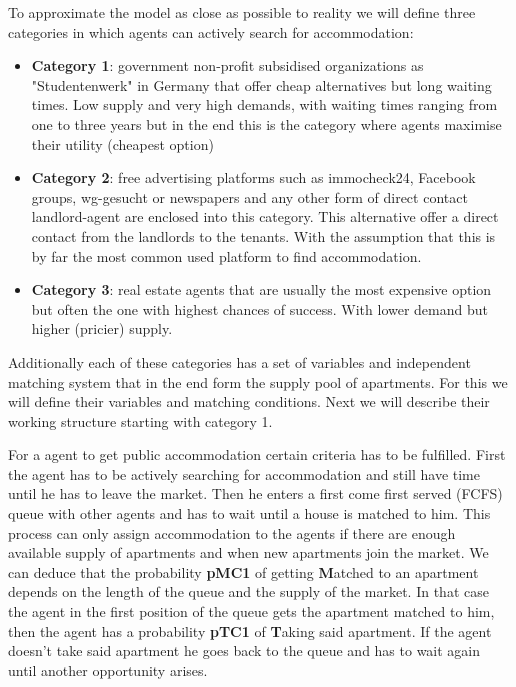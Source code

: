 To approximate the model as close as possible to reality we will define three categories in which agents can actively search for accommodation:
\begin{itemize}
        \item \textbf{Category 1}: government non-profit subsidised organizations as "Studentenwerk" in Germany that offer cheap alternatives but long waiting times. Low supply and very high demands, with waiting times ranging from one to three years but in the end this is the category where agents maximise their utility (cheapest option)
        \item \textbf{Category 2}: free advertising platforms such as immocheck24, Facebook groups, wg-gesucht or newspapers and any other form of direct contact landlord-agent are enclosed into this category. This alternative offer a direct contact from the landlords to the tenants. With the assumption that this is by far the most common used platform to find accommodation.
        \item \textbf{Category 3}: real estate agents that are usually the most expensive option but often the one with highest chances of success. With lower demand but higher (pricier) supply.
\end{itemize}

Additionally each of these categories has a set of variables and independent matching system that in the end form the supply pool of apartments. For this we will define their variables and matching conditions. Next we will describe their working structure starting with category 1.

For a agent to get public accommodation certain criteria has to be fulfilled. First the agent has to be actively searching for accommodation and still have time until he has to leave the market. Then he enters a first come first served (FCFS) queue with other agents and has to wait until a house is matched to him. This process can only assign accommodation to the agents if there are enough available supply of apartments and when new apartments join the market. We can deduce that the probability \textbf{pMC1} of getting \textbf{M}atched to an apartment depends on the length of the queue and the supply of the market. In that case the agent in the first position of the queue gets the apartment matched to him, then the agent has a probability \textbf{pTC1} of \textbf{T}aking said apartment. If the agent doesn't take said apartment he goes back to the queue and has to wait again until another opportunity arises.

